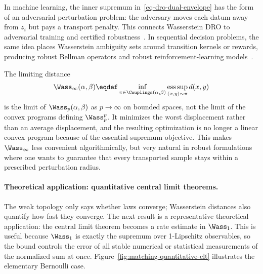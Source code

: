 In machine learning, the inner supremum in~\eqref{eq-dro-dual-envelope} has the form of an adversarial perturbation problem: the adversary moves each datum away from $z_i$ but pays a transport penalty. This connects Wasserstein DRO to adversarial training and certified robustness~\cite{sinha2018certifying,NIPS2015_5745}. In sequential decision problems, the same idea places Wasserstein ambiguity sets around transition kernels or rewards, producing robust Bellman operators and robust reinforcement-learning models~\cite{xu2012distributionallyrobustmdp,yang2017convex}.

The limiting distance
\begin{equation}\label{eq-wass-infty}
	\Wass_\infty(\alpha,\beta)
	\eqdef
	\inf_{\pi\in\Couplings(\alpha,\beta)}
	\operatorname*{ess\,sup}_{(x,y)\sim\pi} d(x,y)
\end{equation}
is the limit of $\Wass_p(\alpha,\beta)$ as $p\to\infty$ on bounded spaces, not the limit of the convex programs defining $\Wass_p^p$. It minimizes the worst displacement rather than an average displacement, and the resulting optimization is no longer a linear convex program because of the essential-supremum objective. This makes $\Wass_\infty$ less convenient algorithmically, but very natural in robust formulations where one wants to guarantee that every transported sample stays within a prescribed perturbation radius.


\paragraph{Theoretical application: quantitative central limit theorems.}

The weak topology only says whether laws converge; Wasserstein distances also quantify how fast they converge. The next result is a representative theoretical application: the central limit theorem becomes a rate estimate in $\Wass_1$. This is useful because $\Wass_1$ is exactly the supremum over 1-Lipschitz observables, so the bound controls the error of all stable numerical or statistical measurements of the normalized sum at once. Figure~\ref{fig:matching-quantitative-clt} illustrates the elementary Bernoulli case.

